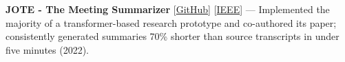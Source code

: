 \item{\small{\textbf{JOTE - The Meeting Summarizer} [\href{https://github.com/Sumedhbhat/MeetingSummarizer.git}{GitHub}] [\href{https://ieeexplore.ieee.org/document/10390455}{IEEE}] — Implemented the majority of a transformer-based research prototype and co-authored its paper; consistently generated summaries 70\% shorter than source transcripts in under five minutes (2022).}}
